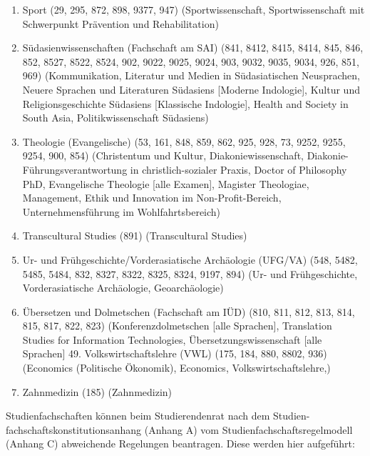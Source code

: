 \begin{enumerate}[noitemsep]
        \item Sport (29, 295, 872, 898, 9377, 947) (Sportwissenschaft, Sportwissenschaft mit Schwerpunkt Prävention und Rehabilitation)  
        \item Südasienwissenschaften (Fachschaft am SAI) (841, 8412, 8415, 8414, 845, 846, 852, 8527, 8522, 8524, 902, 9022, 9025, 9024, 903, 9032, 9035, 9034, 926, 851, 969) (Kommunikation, Literatur und Medien in Südasiatischen Neusprachen, Neuere Sprachen und Literaturen Südasiens [Moderne Indologie], Kultur und Religionsgeschichte Südasiens [Klassische Indologie], Health and Society in South Asia, Politikwissenschaft Südasiens) 
        \item Theologie (Evangelische) (53, 161, 848, 859, 862, 925, 928, 73, 9252, 9255, 9254, 900, 854) (Christentum und Kultur, Diakoniewissenschaft, Diakonie- Führungsverantwortung in christlich-sozialer Praxis, Doctor of Philosophy PhD, Evangelische Theologie [alle Examen], Magister Theologiae, Management, Ethik und Innovation im Non-Profit-Bereich, Unternehmensführung im Wohlfahrtsbereich) 
        \item Transcultural Studies (891) (Transcultural Studies) 
        \item Ur- und Frühgeschichte/Vorderasiatische Archäologie (UFG/VA) (548, 5482, 5485, 5484, 832, 8327, 8322, 8325, 8324, 9197, 894) (Ur- und Frühgeschichte, Vorderasiatische Archäologie, Geoarchäologie) 
        \item Übersetzen und Dolmetschen (Fachschaft am IÜD) (810, 811, 812, 813, 814, 815, 817, 822, 823) (Konferenzdolmetschen [alle Sprachen], Translation Studies for Information Technologies, Übersetzungswissenschaft [alle Sprachen]  49.  Volkswirtschaftslehre (VWL) (175, 184, 880, 8802, 936) (Economics (Politische Ökonomik), Economics, Volkswirtschaftslehre,) 
        \item Zahnmedizin (185) (Zahnmedizin)
    \end{enumerate}
    Studienfachschaften können beim Studierendenrat nach dem Studien-fachschaftskonstitutionsanhang (Anhang A) vom Studienfachschaftsregelmodell (Anhang C) abweichende Regelungen beantragen. Diese werden hier aufgeführt: 
